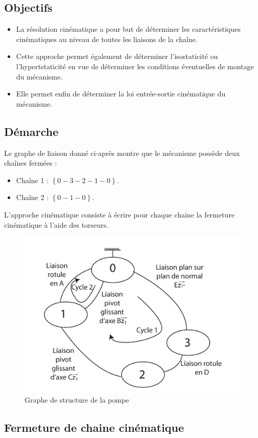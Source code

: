 \documentclass[10pt,fleqn]{article} %
\begin{document}
\begin{multicols}{2}
\begin{multicols}{2}
\subsection{Objectifs}
\begin{itemize}
\item La résolution cinématique a pour but de déterminer les caractéristiques cinématiques au niveau de toutes les liaisons de la chaîne.
\item Cette approche permet également de déterminer l'isostaticité ou l'hypertstaticité en vue de déterminer les conditions éventuelles de montage du mécanisme.
\item Elle permet enfin de déterminer la loi entrée-sortie cinématique du mécanisme.
\end{itemize}
\subsection{Démarche}
Le graphe de liaison donné ci-après montre que le mécanisme possède deux chaînes fermées :
\begin{itemize}
\item Chaîne 1 : $\left\{0-3-2-1-0\right\}$.
\item Chaîne 2 : $\left\{0-1-0\right\}$.
\end{itemize}
L'approche cinématique consiste à écrire pour chaque chaine la fermeture cinématique à l'aide des torseurs.




		\begin{figure}[ht!]
			\begin{center}
				\includegraphics[width=.5\textwidth]{images/graph_structure_pompe2.pdf}
			\end{center}
			\caption{Graphe de structure de la pompe \label{fig:graphe_structure_pompe2}}
\end{figure}


\subsection{Fermeture de chaine cinématique}

\end{multicols}
\end{multicols}
\end{document}
